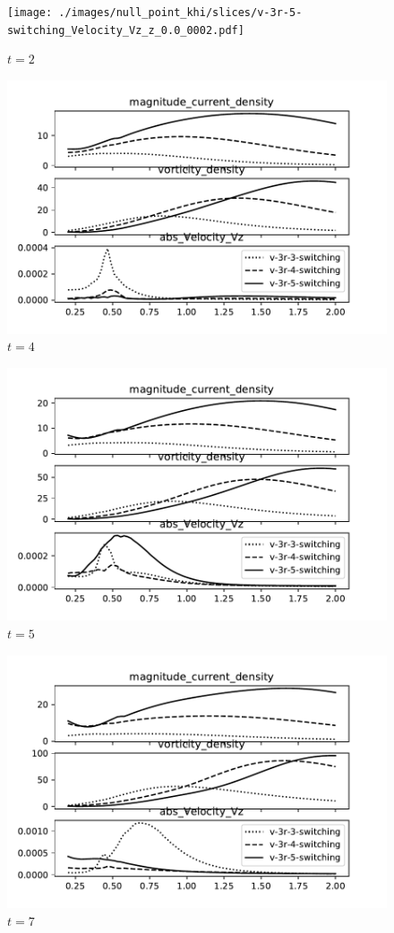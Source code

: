 \begin{figure}[H]
  \centering
  \texttt{[image: ./images/null\_point\_khi/slices/v-3r-5-switching\_Velocity\_Vz\_z\_0.0\_0002.pdf]}
  \caption{$t=2$}%
  \label{fig:v-3r-5-switching_Velocity_Vz_z_0_0002}
\end{figure}

\begin{figure}[h]
  \centering
  \includegraphics[width=0.8\linewidth]{./images/null_point_khi/azimuthal_averages_v-3_4.pdf}
  \caption{$t=4$}%
  \label{fig:azimuthal_averages_v-3_4}
\end{figure}

\begin{figure}[h]
  \centering
  \includegraphics[width=0.8\linewidth]{./images/null_point_khi/azimuthal_averages_v-3_5.pdf}
  \caption{$t=5$}%
  \label{fig:azimuthal_averages_v-3_5}
\end{figure}

\begin{figure}[h]
  \centering
  \includegraphics[width=0.8\linewidth]{./images/null_point_khi/azimuthal_averages_v-3_7.pdf}
  \caption{$t=7$}%
  \label{fig:azimuthal_averages_v-3_7}
\end{figure}

